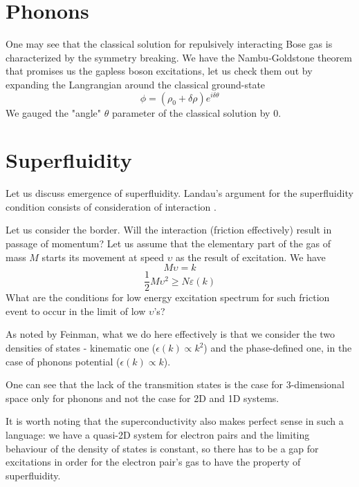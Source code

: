 \documentclass[8pt,letterpaper,notitlepage]{article}
\begin{document}
\section{Phonons}
One may see that the classical solution for repulsively interacting Bose gas is characterized by the symmetry breaking. We have the Nambu-Goldstone theorem that promises us the gapless boson excitations, let us check them out by expanding the Langrangian around the classical ground-state
\begin{equation}
\phi = ( \rho_0 + \delta \rho ) e^{i \delta \theta} 
\end{equation} 
We gauged the "angle" $\theta$ parameter of the classical solution by $0$. 
\section{Superfluidity}
Let us discuss emergence of superfluidity. Landau's argument for the superfluidity condition consists of consideration of interaction .

Let us consider the border. Will the interaction (friction effectively) result in passage of momentum? Let us assume that the elementary part of the gas of mass $M$ starts its movement at speed $\upsilon$ as the result of excitation. We have
\begin{equation}
M \upsilon = k
\end{equation}
\begin{equation}
\frac{1}{2} M \upsilon^2 \geq N \varepsilon(k) 
\end{equation}
What are the conditions for low energy excitation spectrum for such friction event to occur in the limit of low $\upsilon$'s? 

As noted by Feinman, what we do here effectively is that we consider the two densities of states - kinematic one ($\epsilon( k)  \propto k^2$) and the phase-defined one, in the case of phonons potential ($\epsilon( k)  \propto k$).

One can see that the lack of the transmition states is the case for 3-dimensional space only for phonons and not the case for 2D and 1D systems. 

It is worth noting that the superconductivity also makes perfect sense in such a language: we have a quasi-2D system for electron pairs and the limiting behaviour of the density of states is constant, so there has to be a gap for excitations in order for the electron pair's gas to have the property of superfluidity.
\end{document}
